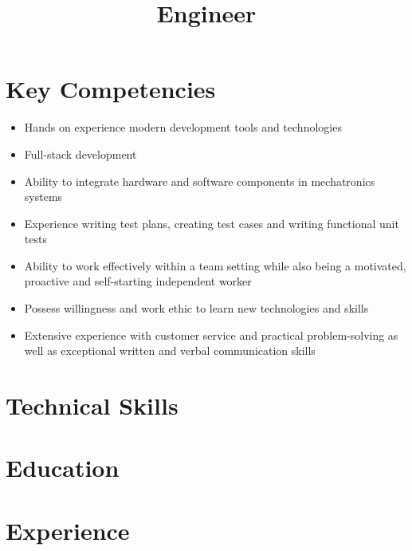 \documentclass[11pt,a4paper,sans]{moderncv}        %
\title{Engineer}                               %
\begin{document}
\makecvtitle
\section{Key Competencies}
\begin{itemize}%
	\item Hands on experience modern development tools and technologies 
	\item Full-stack development
	\item Ability to integrate hardware and software components in mechatronics systems
	\item Experience writing test plans, creating test cases and writing functional unit tests
	\item Ability to work effectively within a team setting	while also being a motivated, proactive and self-starting independent worker
	\item Possess willingness and work ethic to learn new technologies and skills
	\item Extensive experience with customer service and practical problem-solving as well as exceptional written and verbal communication skills
\end{itemize}

\section{Technical Skills}

\section{Education}

\section{Experience}
\end{document}

